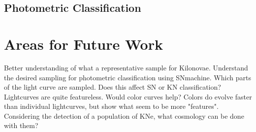 \documentclass[12pt]{article}
\begin{document}
\subsection{Photometric Classification} %

\section{Areas for Future Work} %
Better understanding of what a representative sample for Kilonovae.
Understand the desired sampling for photometric classification using SNmachine. Which parts of the light curve are sampled. Does this affect SN or KN classification?
Lightcurves are quite featureless. Would color curves help? Colors do evolve faster than individual lightcurves, but show what seem to be more "features".
Considering the detection of a population of KNe, what cosmology can be done with them? 



\end{document}
